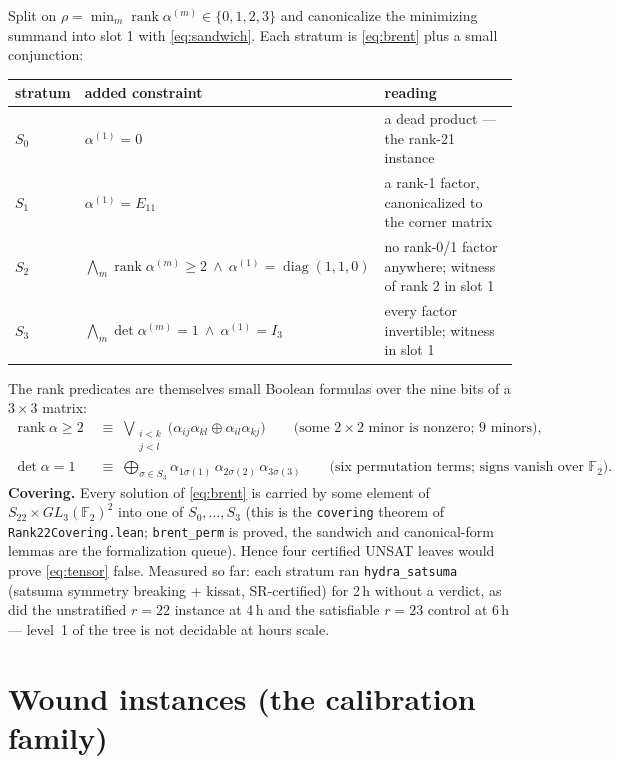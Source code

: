 \documentclass[10pt]{article}
\newcommand{\F}{\mathbb F_2}
\newcommand{\al}[1]{\alpha^{(#1)}}
\DeclareMathOperator{\rank}{rank}
\begin{document}
Split on $\rho = \min_m \rank\al{m}\in\{0,1,2,3\}$ and canonicalize the
minimizing summand into slot 1 with \eqref{eq:sandwich}. Each stratum is
\eqref{eq:brent} plus a small conjunction:
\begin{center}
\small
\begin{tabular}{@{}l l l@{}}
\toprule
stratum & added constraint & reading \\
\midrule
$S_0$ & $\al{1}=0$ & a dead product --- the rank-21 instance \\
$S_1$ & $\al{1}=E_{11}$ & a rank-1 factor, canonicalized to the corner matrix \\
$S_2$ & $\displaystyle\bigwedge_{m}\rank\al{m}\ge 2\ \wedge\ \al{1}=\operatorname{diag}(1,1,0)$
      & no rank-0/1 factor anywhere; witness of rank 2 in slot 1 \\
$S_3$ & $\displaystyle\bigwedge_{m}\det\al{m}=1\ \wedge\ \al{1}=I_3$
      & every factor invertible; witness in slot 1 \\
\bottomrule
\end{tabular}
\end{center}
The rank predicates are themselves small Boolean formulas over the nine
bits of a $3\times3$ matrix:
\begin{align}
  \rank\alpha\ge 2 \;&\equiv\; \bigvee_{\substack{i<k\\ j<l}}
     \big(\alpha_{ij}\alpha_{kl}\oplus\alpha_{il}\alpha_{kj}\big)
     \qquad\text{(some $2\times2$ minor is nonzero; 9 minors)},\label{eq:rank2}\\
  \det\alpha = 1 \;&\equiv\; \bigoplus_{\sigma\in S_3}
     \alpha_{1\sigma(1)}\,\alpha_{2\sigma(2)}\,\alpha_{3\sigma(3)}
     \qquad\text{(six permutation terms; signs vanish over $\F$)}.\label{eq:det}
\end{align}
\textbf{Covering.} Every solution of \eqref{eq:brent} is carried by some
element of $S_{22}\times GL_3(\F)^2$ into one of $S_0,\dots,S_3$ (this is
the \texttt{covering} theorem of \texttt{Rank22Covering.lean};
\texttt{brent\_perm} is proved, the sandwich and canonical-form lemmas
are the formalization queue). Hence four certified UNSAT leaves would
prove \eqref{eq:tensor} false. Measured so far: each stratum ran
\texttt{hydra\_satsuma} (satsuma symmetry breaking + kissat, SR-certified)
for 2\,h without a verdict, as did the unstratified $r=22$ instance at
4\,h and the satisfiable $r=23$ control at 6\,h --- level~1 of the tree
is not decidable at hours scale.

\section{Wound instances (the calibration family)}
\end{document}

